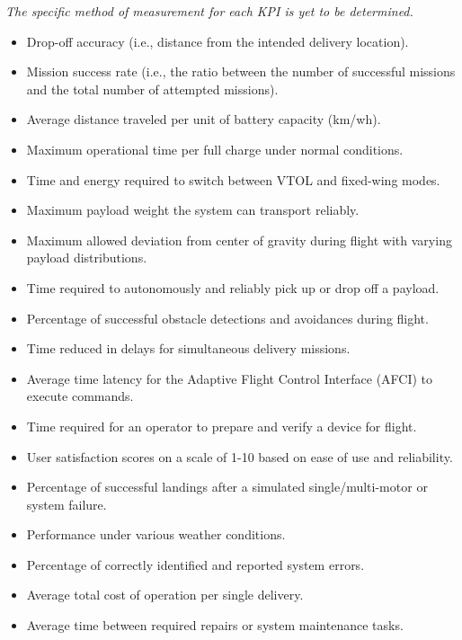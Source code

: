 \documentclass[12pt]{article}
\begin{document}
\textit{The specific method of measurement for each KPI is yet to be determined.}
\begin{itemize}
    \item Drop-off accuracy (i.e., distance from the intended delivery location).
    \item Mission success rate (i.e., the ratio between the number of successful missions and the total number of attempted missions).
    \item Average distance traveled per unit of battery capacity (km/wh).
    \item Maximum operational time per full charge under normal conditions.
    \item Time and energy required to switch between VTOL and fixed-wing modes.
    \item Maximum payload weight the system can transport reliably.
    \item Maximum allowed deviation from center of gravity during flight with varying payload distributions.
    \item Time required to autonomously and reliably pick up or drop off a payload.
    \item Percentage of successful obstacle detections and avoidances during flight.
    \item Time reduced in delays for simultaneous delivery missions.
    \item Average time latency for the Adaptive Flight Control Interface (AFCI) to execute commands.
    \item Time required for an operator to prepare and verify a device for flight.
    \item User satisfaction scores on a scale of 1-10 based on ease of use and reliability.
    \item Percentage of successful landings after a simulated single/multi-motor or system failure.
    \item Performance under various weather conditions.
    \item Percentage of correctly identified and reported system errors.
    \item Average total cost of operation per single delivery.
    \item Average time between required repairs or system maintenance tasks.
\end{itemize}
\end{document}
